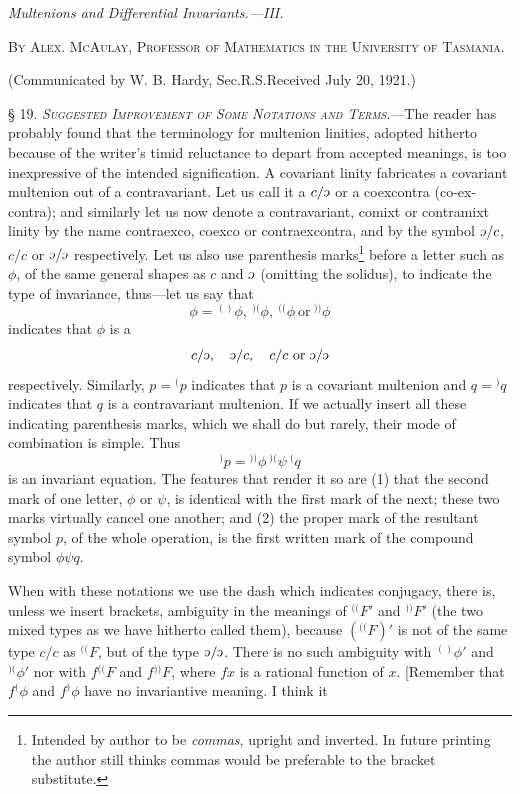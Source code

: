 \documentclass[11pt]{article}
\newcommand{\invc}{\mathord{\rotatebox[origin=c]{180}{$c$}}}
\newcommand{\invc}{\mathord{\text{\invcfont ɔ}}}
\newcommand{\markpair}[3]{{}^{#1#2}#3}
\begin{document}
\thispagestyle{empty}

\begin{center}\textit{Multenions and Differential Invariants.---III.}\end{center}
\begin{center}\textsc{By Alex. McAulay, Professor of Mathematics in the University of Tasmania.}\end{center}
\begin{center}(Communicated by W. B. Hardy, Sec.R.S.\quad Received July 20, 1921.)\end{center}

\noindent\textsc{§ 19. \emph{Suggested Improvement of Some Notations and Terms.}}---The reader has probably found that the terminology for multenion linities, adopted hitherto because of the writer's timid reluctance to depart from accepted meanings, is too inexpressive of the intended signification. A covariant linity fabricates a covariant multenion out of a contravariant. Let us call it a $c/\invc$ or a coexcontra (co-ex-contra); and similarly let us now denote a contravariant, comixt or contramixt linity by the name contraexco, coexco or contraexcontra, and by the symbol $\invc/c$, $c/c$ or $\invc/\invc$ respectively. Let us also use parenthesis marks\footnote{Intended by author to be \emph{commas}, upright and inverted. In future printing the author still thinks commas would be preferable to the bracket substitute.} before a letter such as $\phi$, of the same general shapes as $c$ and $\invc$ (omitting the solidus), to indicate the type of invariance, thus---let us say that
\[
  \phi=\markpair{(}{)}{\phi},\ \markpair{)}{(}{\phi},\ \markpair{(}{(}{\phi}\ \text{or}\ \markpair{)}{)}{\phi}
\]
indicates that $\phi$ is a
\[
  c/\invc,\quad \invc/c,\quad c/c\ \text{or}\ \invc/\invc
\]
respectively. Similarly, $p={}^{(}p$ indicates that $p$ is a covariant multenion and $q={}^{)}q$ indicates that $q$ is a contravariant multenion. If we actually insert all these indicating parenthesis marks, which we shall do but rarely, their mode of combination is simple. Thus
\[
  {}^{)}p=\markpair{)}{)}{\phi}\ \markpair{)}{(}{\psi}\ {}^{(}q
\]
is an invariant equation. The features that render it so are (1) that the second mark of one letter, $\phi$ or $\psi$, is identical with the first mark of the next; these two marks virtually cancel one another; and (2) the proper mark of the resultant symbol $p$, of the whole operation, is the first written mark of the compound symbol $\phi\psi q$.

\indent When with these notations we use the dash which indicates conjugacy, there is, unless we insert brackets, ambiguity in the meanings of $\markpair{(}{(}{F'}$ and $\markpair{)}{)}{F'}$ (the two mixed types as we have hitherto called them), because $(\markpair{(}{(}{F})'$ is not of the same type $c/c$ as $\markpair{(}{(}{F}$, but of the type $\invc/\invc$. There is no such ambiguity with $\markpair{(}{)}{\phi'}$ and $\markpair{)}{(}{\phi'}$ nor with $f\markpair{(}{(}{F}$ and $f\markpair{)}{)}{F}$, where $fx$ is a rational function of $x$. [Remember that $f^{(}\phi$ and $f^{)}\phi$ have no invariantive meaning. I think it
\end{document}
